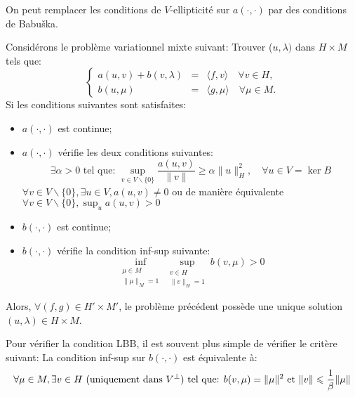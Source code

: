 \medskip



On peut remplacer les conditions de $V$-ellipticité sur $a(\cdot,\cdot)$ par des conditions
de Babuška.

\medskip
\begin{theoreme}
Considérons le problème variationnel mixte suivant:
Trouver ($u, \lambda)$ dans $H\times M$ tels que:
 \begin{equation}\left\{
\begin{array}{rcl}
 a(u,v) + b(v, \lambda) &=& \langle f,v\rangle \quad \forall v\in H,\\
b(u,\mu) &=& \langle g,\mu\rangle \quad \forall \mu \in M.
\end{array}\right.
\end{equation}
Si les conditions suivantes sont satisfaites:
\begin{itemize}
   \item $a(\cdot,\cdot)$ est continue;
   \item $a(\cdot,\cdot)$ vérifie les deux conditions suivantes:
   \begin{equation}\exists \alpha> 0 \text{ tel que: } \sup_{v\in V\backslash\{0\}} \frac{a(u,v)}{\|v\|} \ge\alpha\|u\|_H^2, \quad \forall u\in V=\ker B\end{equation}
   $\forall v\in V\backslash\{0\}, \exists u\in V, a(u,v)\ne 0 $ ou de manière équivalente
 $\displaystyle\forall v\in V\backslash\{0\}, \sup_u a(u,v)> 0 $
   \item $b(\cdot,\cdot)$ est continue;
   \item $b(\cdot,\cdot)$ vérifie la condition inf-sup suivante:
\begin{equation}\inf_{\substack{\mu\in M\\\|\mu\|_M=1}} \sup_{\substack{v\in H\\\|v\|_H=1}} b(v,\mu) > 0\end{equation}
\end{itemize}
Alors, $\forall (f,g)\in H'\times M'$, le problème précédent possède une unique solution
$(u,\lambda) \in H\times M$.
\end{theoreme}
Pour vérifier la condition LBB, il est souvent plus simple de vérifier le critère suivant:
La condition inf-sup sur $b(\cdot,\cdot)$ est équivalente à:
\begin{equation}\colorred
\forall\mu\in M, \exists v\in H \text{ (uniquement dans }V^\bot\text{) tel que: }
b(v,\mu)=\|\mu\|^2 \text{ et } \|v\|\le \dfrac1\beta \|\mu\|
\end{equation}









